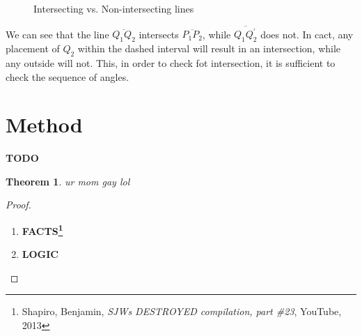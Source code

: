 \documentclass{article}
\newtheorem{theorem}{Theorem}
\begin{document}
\begin{figure}[h]
\centering
{}
\caption{Intersecting vs. Non-intersecting lines}

\end{figure}

We can see that the line $\overline{Q_1 Q_2}$ intersects $\overline{P_1 P_2}$,
while $\overline{Q_1 Q_2^{\prime}}$ does not. In cact, any placement of $Q_2$ within the dashed interval
will result in an intersection, while any outside will not. This, in order to check fot intersection, it is sufficient to check the sequence of angles.

\section{Method}
\textbf{TODO}

\vspace{2in}

\renewcommand\qedsymbol{\framebox{\textit{\small libtards destroyed}}}

\begin{theorem}
    ur mom gay lol
\end{theorem}
\begin{proof}
    \begin{enumerate}
        \item \textbf{FACTS\footnote{Shapiro, Benjamin, \textit{SJWs DESTROYED compilation, part \#23}, YouTube, 2013}}
        \item \textbf{LOGIC}
    \end{enumerate}
\end{proof}
\end{document}
